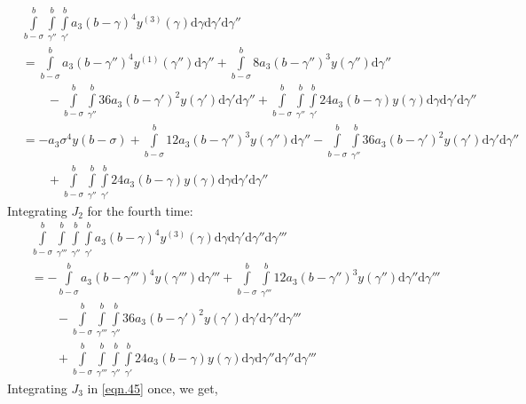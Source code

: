 \documentclass{article}
\begin{document}
\begin{equation}
\begin{split}
	&\int\limits_{b-\sigma}^{b}\int\limits_{\gamma''}^{b}\int\limits_{\gamma'}^{b}a_3(b-\gamma)^{4}y^{(3)}(\gamma)\mathrm{d}\gamma\mathrm{d}\gamma'\mathrm{d}\gamma''\\
	&=\int\limits_{b-\sigma}^{b}a_3(b-\gamma'')^{4}y^{(1)}(\gamma'')\mathrm{d}\gamma'' + \int\limits_{b-\sigma}^{b}8a_3(b-\gamma'')^{3}y(\gamma'')\mathrm{d}\gamma''\\&\qquad{} - \int\limits_{b-\sigma}^{b}\int\limits_{\gamma''}^{b}36a_3(b-\gamma')^{2}y(\gamma')\mathrm{d}\gamma'\mathrm{d}\gamma''+\int\limits_{b-\sigma}^{b}\int\limits_{\gamma''}^{b}\int\limits_{\gamma'}^{b}24a_3(b-\gamma)y(\gamma)\mathrm{d}\gamma\mathrm{d}\gamma'\mathrm{d}\gamma''\\
	&=-a_3\sigma^{4}y(b-\sigma) + \int\limits_{b-\sigma}^{b}12a_3(b-\gamma'')^{3}y(\gamma'')\mathrm{d}\gamma'' - \int\limits_{b-\sigma}^{b}\int\limits_{\gamma''}^{b}36a_3(b-\gamma')^2y(\gamma')\mathrm{d}\gamma'\mathrm{d}\gamma''\\
	&\qquad{} +\int\limits_{b-\sigma}^{b}\int\limits_{\gamma''}^{b}\int\limits_{\gamma'}^{b}24a_3(b-\gamma)y(\gamma)\mathrm{d}\gamma\mathrm{d}\gamma'\mathrm{d}\gamma''
\end{split}
\end{equation}
Integrating $J_2$ for the fourth time:
\begin{equation}
\begin{split}
	&\int\limits_{b-\sigma}^{b}\int\limits_{\gamma'''}^{b}\int\limits_{\gamma''}^{b}\int\limits_{\gamma'}^{b}a_3(b-\gamma)^{4}y^{(3)}(\gamma)\mathrm{d}\gamma\mathrm{d}\gamma'\mathrm{d}\gamma''\mathrm{d}\gamma'''\\
	&=-\int\limits_{b-\sigma}^{b}a_3(b-\gamma''')^{4}y(\gamma''')\mathrm{d}\gamma''' + \int\limits_{b-\sigma}^{b}\int\limits_{\gamma'''}^{b}12a_3(b-\gamma'')^{3}y(\gamma'')\mathrm{d}\gamma''\mathrm{d}\gamma'''\\
	&\qquad{}-\int\limits_{b-\sigma}^{b}\int\limits_{\gamma'''}^{b}\int\limits_{\gamma''}^{b}36a_3(b-\gamma')^{2}y(\gamma')\mathrm{d}\gamma'\mathrm{d}\gamma''\mathrm{d}\gamma'''\\&\qquad{} + \int\limits_{b-\sigma}^{b}\int\limits_{\gamma'''}^{b}\int\limits_{\gamma''}^{b}\int\limits_{\gamma'}^{b}24a_3(b-\gamma)y(\gamma)\mathrm{d}\gamma\mathrm{d}\gamma''\mathrm{d}\gamma''\mathrm{d}\gamma'''
\end{split}
\end{equation}
Integrating $J_3$ in \eqref{eqn.45} once, we get,
\end{document}
